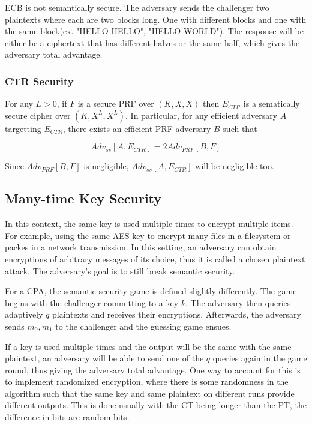 \documentclass{article}
\begin{document}
\begin{multicols}{2}
ECB is not semantically secure. The adversary sends the challenger two plaintexts where each are two blocks long. One with different blocks and one with the same block(ex. "HELLO HELLO", "HELLO WORLD"). The response will be either be a ciphertext that has different halves or the same half, which gives the adversary total advantage.

\subsubsection{CTR Security}

For any $L>0$, if $F$ is a secure PRF over $(K,X,X)$ then $E_{CTR}$ is a sematically secure cipher over $(K,X^L,X^L)$. In particular, for any efficient adversary $A$ targetting $E_{CTR}$, there exists an efficient PRF adversary $B$ such that 

$$
Adv_{ss}[A,E_{CTR}] = 2Adv_{PRF}[B,F]
$$

Since $Adv_{PRF}[B,F]$ is negligible, $Adv_{ss}[A,E_{CTR}]$ will be negligible too.

\subsection{Many-time Key Security}

In this context, the same key is used multiple times to encrypt multiple items. For example, using the same AES key to encrypt many files in a filesystem or packes in a network transmission. In this setting, an adversary can obtain encryptions of arbitrary messages of its choice, thus it is called a chosen plaintext attack. The adversary's goal is to still break semantic security.

For a CPA, the semantic security game is defined slightly differently. The game begins with the challenger committing to a key $k$. The adversary then queries adaptively $q$ plaintexts and receives their encryptions. Afterwards, the adversary sends $m_0, m_1$ to the challenger and the guessing game ensues.

If a key is used multiple times and the output will be the same with the same plaintext, an adversary will be able to send one of the $q$ queries again in the game round, thus giving the adversary total advantage. One way to account for this is to implement randomized encryption, where there is some randomness in the algorithm such that the same key and same plaintext on different runs provide different outputs. This is done usually with the CT being longer than the PT, the difference in bits are random bits.


\end{multicols}
\end{document}
